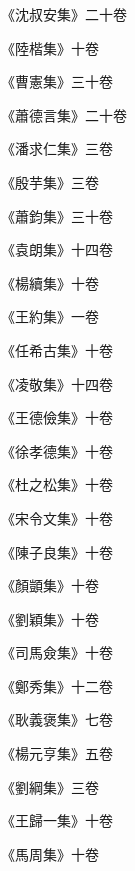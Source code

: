 \begin{pinyinscope}
 《沈叔安集》二十卷



 《陸楷集》十卷



 《曹憲集》三十卷



 《蕭德言集》二十卷



 《潘求仁集》三卷



 《殷芋集》三卷



 《蕭鈞集》三十卷



 《袁朗集》十四卷



 《楊續集》十卷



 《王約集》一卷



 《任希古集》十卷



 《凌敬集》十四卷



 《王德儉集》十卷



 《徐孝德集》十卷



 《杜之松集》十卷



 《宋令文集》十卷



 《陳子良集》十卷



 《顏顗集》十卷



 《劉穎集》十卷



 《司馬僉集》十卷



 《鄭秀集》十二卷



 《耿義褒集》七卷



 《楊元亨集》五卷



 《劉綱集》三卷



 《王歸一集》十卷



 《馬周集》十卷




\end{pinyinscope}
